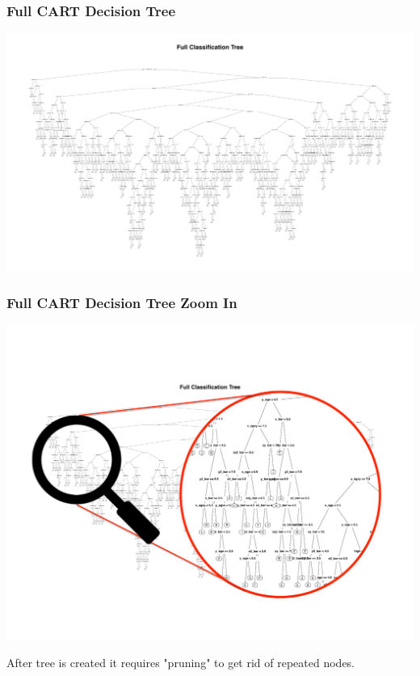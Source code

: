 \documentclass{beamer}
\begin{document}
\begin{frame}
\frametitle{Full CART Decision Tree}
\begin{center} 
\includegraphics[width=1 \textwidth]{FullCT}
\end{center}

\end{frame}

\begin{frame}
\frametitle{Full CART Decision Tree Zoom In }
\begin{center} 
\includegraphics[width=.8 \textwidth]{magGlass}

\small{After tree is created it requires "pruning" to get rid of repeated nodes.}
\end{center}
\end{frame}
\end{document}
